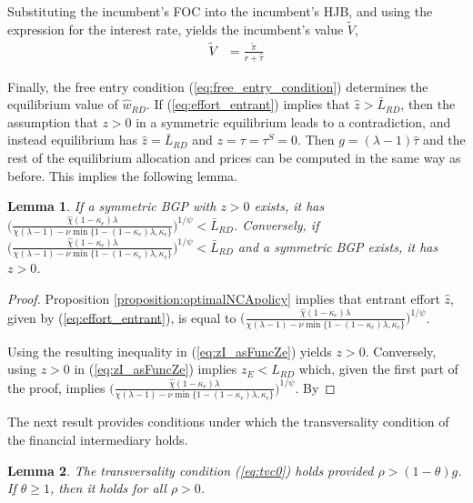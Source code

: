 \documentclass[11pt,english]{article}
\newtheorem{lemma}{Lemma}
\begin{document}
Substituting the incumbent's FOC into the incumbent's HJB, and using the expression for the interest rate, yields the incumbent's value $\tilde{V}$,
\begin{align}
	 \tilde{V} &= \frac{\tilde{\pi}}{r + \hat{\tau}} \label{eq:hjb_incumbent_gordon_formula}
\end{align}

Finally, the free entry condition (\ref{eq:free_entry_condition}) determines the equilibrium value of $\hat{w}_{RD}$. If (\ref{eq:effort_entrant}) implies that $\hat{z} > \bar{L}_{RD}$, then the assumption that $z > 0$ in a symmetric equilibrium leads to a contradiction, and instead equilibrium has $\hat{z} = \bar{L}_{RD}$ and $z = \tau = \tau^S = 0$. Then $g = (\lambda - 1) \hat{\tau}$ and the rest of the equilibrium allocation and prices can be computed in the same way as before. This implies the following lemma.

\begin{lemma}\label{model:lemma:zge0condition}
	If a symmetric BGP with $z > 0$ exists, it has $\Big( \frac{\hat{\chi} (1-\kappa_{e}) \lambda}{\chi(\lambda-1) - \nu \min\{ 1-(1-\kappa_e) \lambda, \kappa_c \}} \Big)^{1/\psi} < \bar{L}_{RD}$. Conversely, if $\Big( \frac{\hat{\chi} (1-\kappa_{e}) \lambda}{\chi(\lambda-1) - \nu \min\{ 1-(1-\kappa_e) \lambda, \kappa_c \}} \Big)^{1/\psi} < \bar{L}_{RD}$ and a symmetric BGP exists, it has $z > 0$.
\end{lemma}

\begin{proof}
	Proposition \ref{proposition:optimalNCApolicy} implies that entrant effort $\hat{z}$, given by (\ref{eq:effort_entrant}), is equal to $\Big( \frac{\hat{\chi} (1-\kappa_{e}) \lambda}{\chi(\lambda-1) - \nu \min\{ 1-(1-\kappa_e) \lambda, \kappa_c \}} \Big)^{1/\psi}$. 
	
	Using the resulting inequality in (\ref{eq:zI_asFuncZe}) yields $z > 0$. Conversely, using $z > 0$ in (\ref{eq:zI_asFuncZe}) implies $z_E < L_{RD}$ which, given the first part of the proof, implies $\Big( \frac{\hat{\chi} (1-\kappa_{e}) \lambda}{\chi(\lambda-1) - \nu \min\{ 1-(1-\kappa_e) \lambda, \kappa_c \}} \Big)^{1/\psi}$. By 
\end{proof}

The next result provides conditions under which the transversality condition of the financial intermediary holds.

\begin{lemma}
	The transversality condition (\ref{eq:tvc0}) holds provided $\rho > (1-\theta) g$. If $\theta \ge 1$, then it holds for all $\rho > 0$.
\end{lemma}
\end{document}
